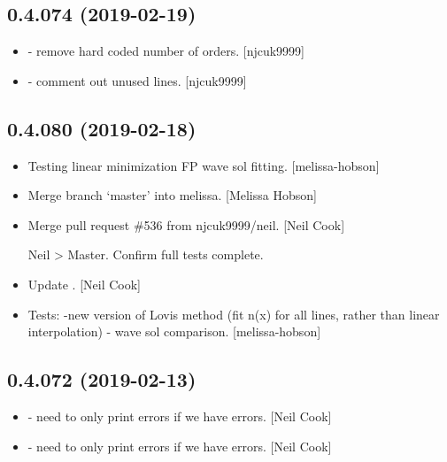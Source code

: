 \documentclass[a4paper,10pt,english]{report}
\begin{document}
\subsection{0.4.074 (2019-02-19)}
\label{\detokenize{misc/changelog:id183}}\begin{itemize}
\item {} 
 - remove hard coded number of orders. {[}njcuk9999{]}

\item {} 
 - comment out unused lines. {[}njcuk9999{]}

\end{itemize}


\subsection{0.4.080 (2019-02-18)}
\label{\detokenize{misc/changelog:id184}}\begin{itemize}
\item {} 
Testing linear minimization FP wave sol fitting. {[}melissa-hobson{]}

\item {} 
Merge branch ‘master’ into melissa. {[}Melissa Hobson{]}

\item {} 
Merge pull request \#536 from njcuk9999/neil. {[}Neil Cook{]}

Neil \textendash{}\textgreater{} Master. Confirm full tests complete.

\item {} 
Update . {[}Neil Cook{]}

\item {} 
Tests: -new version of Lovis method (fit n(x) for all lines, rather
than linear interpolation) - wave sol comparison. {[}melissa-hobson{]}

\end{itemize}


\subsection{0.4.072 (2019-02-13)}
\label{\detokenize{misc/changelog:id185}}\begin{itemize}
\item {} 
 - need to only print errors if we have errors.
{[}Neil Cook{]}

\item {} 
 - need to only print errors if we have errors.
{[}Neil Cook{]}

\end{itemize}
\end{document}
